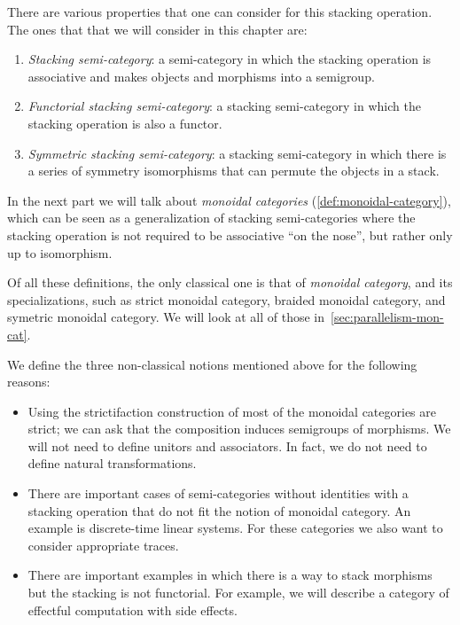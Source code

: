 There are various properties that one can consider for this stacking operation.
The ones that that we will consider in this chapter are:
%
\begin{enumerate}
    \item \emph{Stacking semi-category}: a semi-category in which the stacking operation is associative and makes objects and morphisms into a semigroup.
    \item \emph{Functorial stacking semi-category}: a stacking semi-category in which the stacking operation is also a functor.
    \item \emph{Symmetric stacking semi-category}: a stacking semi-category in which there is a series of symmetry isomorphisms that can permute the objects in a stack.
\end{enumerate}
%
In the next part we will talk about \emph{monoidal categories} (\cref{def:monoidal-category}), which can be seen as a generalization of stacking semi-categories where the stacking operation is not required to be associative ``on the nose'', but rather only up to isomorphism.

\begin{remark}
    Of all these definitions, the only classical one is that of \emph{monoidal category}, and its specializations, such as strict monoidal category, braided monoidal category, and symetric monoidal category. We will look at all of those in~\cref{sec:parallelism-mon-cat}.

    We define the three non-classical notions mentioned above for the following reasons:
    \begin{itemize}
        \item Using the strictifaction construction of \SetStar most of the monoidal categories are strict; we can ask that the composition induces semigroups of morphisms.
        We will not need to define unitors and associators.
        In fact, we do not need to define natural transformations.
        \item There are important cases of semi-categories without identities with a stacking operation that do not fit the notion of monoidal category.
        An example is discrete-time linear systems.
        For these categories we also want to consider appropriate traces.
        \item There are important examples in which there is a way to stack morphisms but the stacking is not functorial. For example, we will describe a category of effectful computation with side effects.
    \end{itemize}
\end{remark}

